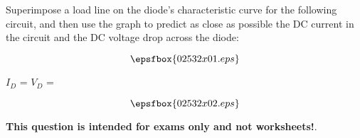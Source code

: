 

Superimpose a load line on the diode's characteristic curve for the following circuit, and then use the graph to predict as close as possible the DC current in the circuit and the DC voltage drop across the diode:

$$\epsfbox{02532x01.eps}$$

$I_D$ = \hskip 80pt $V_D$ = 







$$\epsfbox{02532x02.eps}$$







{\bf This question is intended for exams only and not worksheets!}.




